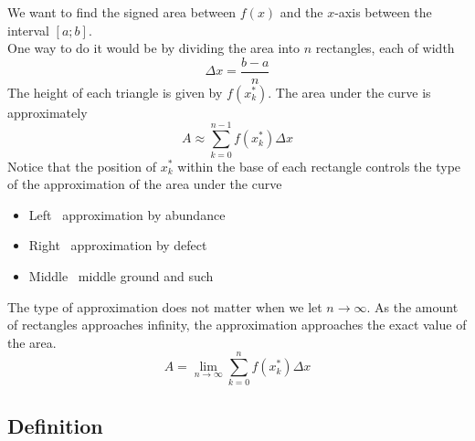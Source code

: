 \documentclass{article}
\begin{document}
We want to find the signed area between \(f(x)\) and the \(x\)-axis between
the interval \([a;b]\).\\
One way to do it would be by dividing the area into \(n\) rectangles, each of width
\[
    \Delta x = \frac{b-a}{n}
\]
The height of each triangle is given by \(f(x_k^*)\).
The area under the curve is approximately
\[
    A \approx \sum_{k=0}^{n-1}f(x_k^*)\Delta x
\]
Notice that the position of \(x_k^*\) within the base of each rectangle controls the type of
the approximation of the area under the curve
\\
\begin{itemize}
    \item Left \rightarrow\, approximation by abundance
    \item Right \rightarrow\, approximation by defect
    \item Middle \rightarrow\, middle ground and such
\end{itemize}
The type of approximation does not matter when we let \(n\to \infty\).
As the amount of rectangles approaches infinity, the approximation approaches
the exact value of the area.
\[
    A = \lim_{n\to\infty} \sum_{k=0}^{n}f(x_k^*)\Delta x
\]

\subsection{Definition}
\end{document}
